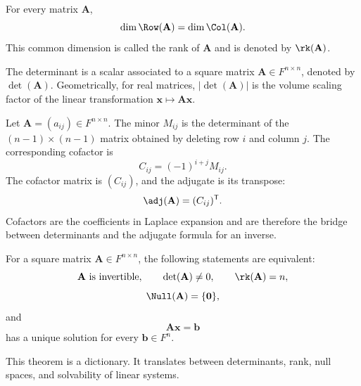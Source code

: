     \begin{theorem}
        For every matrix $\mathbf{A}$,
        \[
            \dim\Row(\mathbf{A})
            =
            \dim\Col(\mathbf{A}).
        \]
        This common dimension is called the rank of $\mathbf{A}$ and is denoted
        by $\rk(\mathbf{A})$.
    \end{theorem}

    \begin{definition}[Determinant]
        The determinant is a scalar associated to a square matrix
        $\mathbf{A}\in F^{n\times n}$, denoted by $\det(\mathbf{A})$.
        Geometrically, for real matrices, $|\det(\mathbf{A})|$ is the volume
        scaling factor of the linear transformation
        $\mathbf{x}\mapsto\mathbf{A}\mathbf{x}$.
    \end{definition}

    \begin{definition}
        Let $\mathbf{A}=(a_{ij})\in F^{n\times n}$. The minor $M_{ij}$ is the
        determinant of the $(n-1)\times(n-1)$ matrix obtained by deleting row
        $i$ and column $j$. The corresponding cofactor is
        \[
            C_{ij}=(-1)^{i+j}M_{ij}.
        \]
        The cofactor matrix is $(C_{ij})$, and the adjugate is its transpose:
        \[
            \adj(\mathbf{A})=(C_{ij})^{\mathsf T}.
        \]
        Cofactors are the coefficients in Laplace expansion and are therefore
        the bridge between determinants and the adjugate formula for an inverse.
    \end{definition}

    \begin{theorem}
        For a square matrix $\mathbf{A}\in F^{n\times n}$, the following
        statements are equivalent:
        \[
            \mathbf{A}\text{ is invertible},
            \qquad
            \det(\mathbf{A})\neq 0,
            \qquad
            \rk(\mathbf{A})=n,
        \]
        \[
            \Null(\mathbf{A})=\{\mathbf{0}\},
        \]
        and
        \[
            \mathbf{A}\mathbf{x}=\mathbf{b}
        \]
        has a unique solution for every $\mathbf{b}\in F^n$.
    \end{theorem}

    \begin{remark}
        This theorem is a dictionary. It translates between determinants, rank,
        null spaces, and solvability of linear systems.
    \end{remark}

